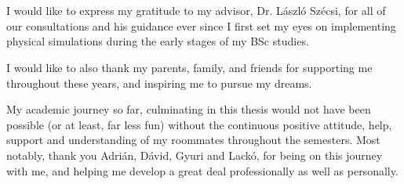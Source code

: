 \chapter*{\koszonetnyilvanitas}

I would like to express my gratitude to my advisor, Dr. László Szécsi, for all
of our consultations and his guidance ever since I first set my eyes on
implementing physical simulations during the early stages of my BSc studies.

I would like to also thank my parents, family, and friends for supporting me
throughout these years, and inspiring me to pursue my dreams.

My academic journey so far, culminating in this thesis would not have been
possible (or at least, far less fun) without the continuous positive attitude,
help, support and understanding of my roommates throughout the semesters. Most
notably, thank you Adrián, Dávid, Gyuri and Lackó, for being on this journey
with me, and helping me develop a great deal professionally as well as
personally.
